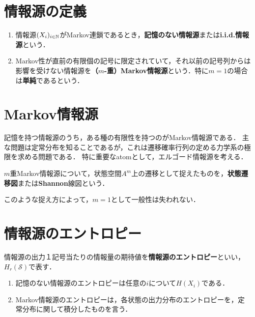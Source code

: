 \documentclass[uplatex,dvipdfmx]{jsreport}
\renewcommand{\S}{\mathcal{S}}
\begin{document}
\section{情報源の定義}

\begin{definition}\mbox{}
    \begin{enumerate}
        \item 情報源$(X_i)_{i\in\mathbb{N}}$がMarkov連鎖であるとき，\textbf{記憶のない情報源}または\textbf{i.i.d.情報源}という．
        \item Markov性が直前の有限個の記号に限定されていて，それ以前の記号列からは影響を受けない情報源を\textbf{（$m$-重）Markov情報源}という．特に$m=1$の場合は\textbf{単純}であるという．
    \end{enumerate}
\end{definition}

\section{Markov情報源}

\begin{tcolorbox}[colframe=ForestGreen, colback=ForestGreen!10!white,breakable,colbacktitle=ForestGreen!40!white,coltitle=black,fonttitle=\bfseries\sffamily,
title=]
    記憶を持つ情報源のうち，ある種の有限性を持つのがMarkov情報源である．
    主な問題は定常分布を知ることであるが，これは遷移確率行列の定める力学系の極限を求める問題である．
    特に重要なatomとして，エルゴード情報源を考える．
\end{tcolorbox}

\begin{definition}
    $m$重Markov情報源について，状態空間$A^m$上の遷移として捉えたものを，\textbf{状態遷移図}または\textbf{Shannon}線図という．
\end{definition}
\begin{remarks}
    このような捉え方によって，$m=1$として一般性は失われない．
\end{remarks}

\section{情報源のエントロピー}

\begin{definition}
    情報源の出力１記号当たりの情報量の期待値を\textbf{情報源のエントロピー}といい，$H_r(\S)$で表す．
\end{definition}
\begin{example}\mbox{}
    \begin{enumerate}
        \item 記憶のない情報源のエントロピーは任意の$i$について$H(X_i)$である．
        \item Markov情報源のエントロピーは，各状態の出力分布のエントロピーを，定常分布に関して積分したものを言う．
    \end{enumerate}
\end{example}
\end{document}
